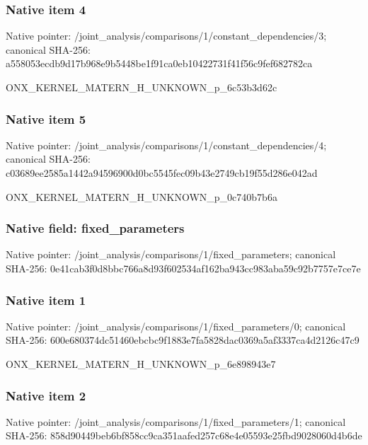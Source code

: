 \documentclass[10pt,a4paper]{article}
\begin{document}
\subsubsection{Native item 4}
Native pointer: /joint\_\allowbreak{}analysis/comparisons/1/constant\_\allowbreak{}dependencies/3; canonical SHA-256: a558053ecdb9d17b968e9b5448be1f91ca0eb10422731f41f56c9fef682782ca

\begingroup\raggedright\sloppy ONX\_\allowbreak{}KERNEL\_\allowbreak{}MATERN\_\allowbreak{}H\_\allowbreak{}UNKNOWN\_\allowbreak{}p\_\allowbreak{}6c53b3d62c\par\endgroup

\subsubsection{Native item 5}
Native pointer: /joint\_\allowbreak{}analysis/comparisons/1/constant\_\allowbreak{}dependencies/4; canonical SHA-256: c03689ee2585a1442a94596900d0bc5545fec09b43e2749cb19f55d286e042ad

\begingroup\raggedright\sloppy ONX\_\allowbreak{}KERNEL\_\allowbreak{}MATERN\_\allowbreak{}H\_\allowbreak{}UNKNOWN\_\allowbreak{}p\_\allowbreak{}0c740b7b6a\par\endgroup

\subsubsection{Native field: fixed\_\allowbreak{}parameters}
Native pointer: /joint\_\allowbreak{}analysis/comparisons/1/fixed\_\allowbreak{}parameters; canonical SHA-256: 0e41cab3f0d8bbc766a8d93f602534af162ba943cc983aba59c92b7757e7ce7e

\subsubsection{Native item 1}
Native pointer: /joint\_\allowbreak{}analysis/comparisons/1/fixed\_\allowbreak{}parameters/0; canonical SHA-256: 600e680374dc51460ebcbc9f1883e7fa5828dac0369a5af3337ca4d2126c47c9

\begingroup\raggedright\sloppy ONX\_\allowbreak{}KERNEL\_\allowbreak{}MATERN\_\allowbreak{}H\_\allowbreak{}UNKNOWN\_\allowbreak{}p\_\allowbreak{}6e898943e7\par\endgroup

\subsubsection{Native item 2}
Native pointer: /joint\_\allowbreak{}analysis/comparisons/1/fixed\_\allowbreak{}parameters/1; canonical SHA-256: 858d90449beb6bf858cc9ca351aafed257c68e4e05593e25fbd9028060d4b6de
\end{document}
